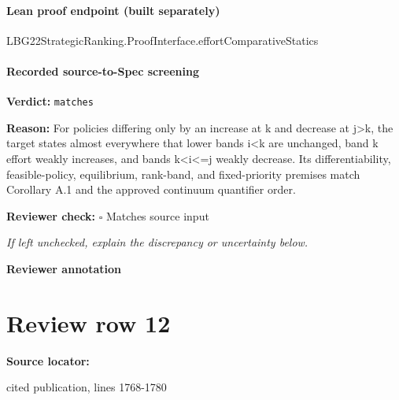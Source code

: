 \documentclass[10pt]{article}
\newcommand{\reviewerbox}{%
  \par\noindent\fbox{\parbox{0.96\linewidth}{\rule{0pt}{0.38in}}}\par
}
\newcommand{\reviewmatch}[1]{%
  \par\noindent\textbf{Reviewer check:} $\square$\; #1\par
  \noindent\emph{If left unchecked, explain the discrepancy or uncertainty below.}\par
}
\begin{document}
\paragraph{Lean proof endpoint (built separately)}\begin{ReviewVerbatim}
LBG22StrategicRanking.ProofInterface.effortComparativeStatics
\end{ReviewVerbatim}

\paragraph{Recorded source-to-Spec screening}
\textbf{Verdict:} \texttt{matches}
\\
{\raggedright
\textbf{Reason:} For policies differing only by an increase at k and decrease at j>k, the target states almost everywhere that lower bands i<k are unchanged, band k effort weakly increases, and bands k<i<=j weakly decrease.\allowbreak{} Its differentiability, feasible-\allowbreak{}policy, equilibrium, rank-\allowbreak{}band, and fixed-\allowbreak{}priority premises match Corollary A.\allowbreak{}1 and the approved continuum quantifier order.\allowbreak{}
\par}
\reviewmatch{Matches source input}
\noindent\textbf{Reviewer annotation}\par
\reviewerbox
\clearpage
\hypertarget{source-claim-ed834a4cf517d7fc}{}
\section*{Review row 12}
\textbf{Source locator:} {\footnotesize\raggedright cited publication, lines 1768-\allowbreak{}1780\par}
\end{document}

